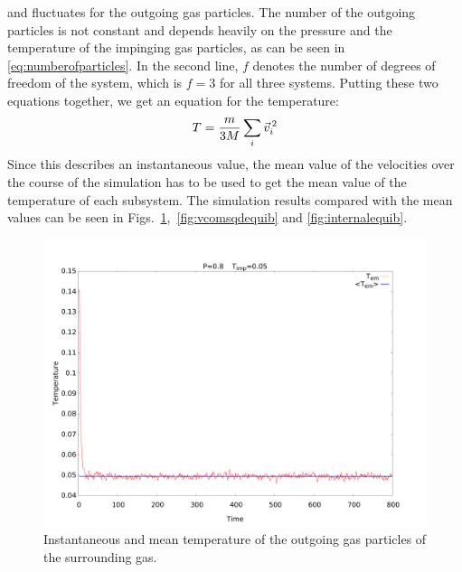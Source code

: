 \documentclass[12pt]{article}
\begin{document}
and fluctuates for the outgoing gas particles. The number of the outgoing particles is not constant and depends heavily on the pressure and the
temperature of the impinging gas particles, as can be seen in \eqref{eq:numberofparticles}. In the second line, $f$ denotes the number of degrees of
freedom of the system, which is $f=3$ for all three systems. Putting these two equations together, we get an equation for the temperature:
\begin{equation}
    T = \frac{m}{3 M} \sum_i \vec{v}_i^{\, 2} \\
\end{equation}
Since this describes an instantaneous value, the mean value of the velocities over the course of the simulation has to be used to get the mean value
of the temperature of each subsystem. The simulation results compared with the mean values can be seen in
Figs.~\ref{fig:outgoingequib},~\ref{fig:vcomsqdequib} and \ref{fig:internalequib}.
\begin{figure}[h]
    \begin{center}
        \includegraphics[scale=0.4]{images/gastemp.pdf}
        \caption{Instantaneous and mean temperature of the outgoing gas particles of the surrounding gas.}
        \label{fig:outgoingequib}
    \end{center}
\end{figure}
\end{document}
